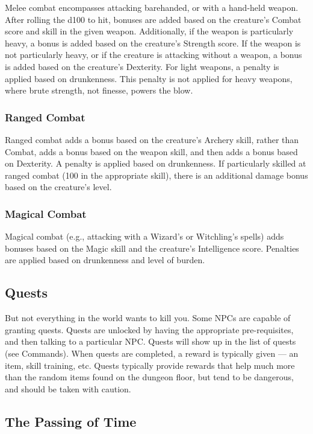 Melee combat encompasses attacking barehanded, or with a hand-held
weapon.  After rolling the d100 to hit, bonuses are added based on the
creature's Combat score and skill in the given weapon.  Additionally, if
the weapon is particularly heavy, a bonus is added based on the creature's
Strength score.  If the weapon is not particularly heavy, or if the
creature is attacking without a weapon, a bonus is added based on the 
creature's Dexterity.  For light weapons, a penalty is applied based on
drunkenness.  This penalty is not applied for heavy weapons, where brute
strength, not finesse, powers the blow.

\subsubsection{Ranged Combat}

Ranged combat adds a bonus based on the creature's Archery skill, rather
than Combat, adds a bonus based on the weapon skill, and then adds a 
bonus based on Dexterity.  A penalty is applied based on drunkenness.  If
particularly skilled at ranged combat (100 in the appropriate skill), there
is an additional damage bonus based on the creature's level.

\subsubsection{Magical Combat}

Magical combat (e.g., attacking with a Wizard's or Witchling's spells)
adds bonuses based on the Magic skill and the creature's Intelligence
score.  Penalties are applied based on drunkenness and level of burden.

\subsection{Quests}

But not everything in the world wants to kill you.  Some NPCs are capable 
of granting quests.  Quests are unlocked by having the appropriate 
pre-requisites, and then talking to a particular NPC.  Quests will show up 
in the list of quests (see Commands).  When quests are completed, a reward 
is typically given --- an item, skill training, etc.  Quests typically 
provide rewards that help much more than the random items found on the 
dungeon floor, but tend to be dangerous, and should be taken with caution.

\subsection{The Passing of Time}

